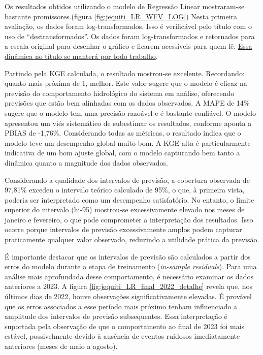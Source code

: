 Os resultados obtidos utilizando o modelo de Regressão Linear mostraram-se bastante promissores.(figura \ref{fig:jequiti_LR_WFV_LOG}) Nesta primeira avaliação, os dados foram log-transformados. Isso é verificável pelo título com o uso de ``destransformados''. Os dados foram log-transformados e retornados para a escala original para desenhar o gráfico e ficarem acessíveis para quem lê. \underline{Essa dinâmica no título se manterá por todo trabalho}.

Partindo pela KGE calculada, o resultado mostrou-se excelente. Recordando: quanto mais próxima de 1, melhor. Este valor sugere que o modelo é eficaz na previsão do comportamento hidrológico do sistema em análise, oferecendo previsões que estão bem alinhadas com os dados observados. A MAPE de 14\% sugere que o modelo tem uma precisão razoável e é bastante confiável. O modelo apresentou um viés sistemático de subestimar os resultados, conforme aponta a PBIAS de -1,76\%. Considerando todas as métricas, o resultado indica que o modelo teve um desempenho global muito bom. A KGE alta é particularmente indicativa de um bom ajuste global, com o modelo capturando bem tanto a dinâmica quanto a magnitude dos dados observados.

Considerando a qualidade dos intervalos de previsão, a cobertura observada de 97,81\% excedeu o intervalo teórico calculado de 95\%, o que, à primeira vista, poderia ser interpretado como um desempenho satisfatório. No entanto, o limite superior do intervalo (hi-95) mostrou-se excessivamente elevado nos meses de janeiro e fevereiro, o que pode comprometer a interpretação dos resultados. Isso ocorre porque intervalos de previsão excessivamente amplos podem capturar praticamente qualquer valor observado, reduzindo a utilidade prática da previsão.

É importante destacar que os intervalos de previsão são calculados a partir dos erros do modelo durante a etapa de treinamento (\textit{in-sample residuals}). Para uma análise mais aprofundada desse comportamento, é necessário examinar os dados anteriores a 2023. A figura \ref{fig:jequiti_LR_final_2022_detalhe} revela que, nos últimos dias de 2022, houve observações significativamente elevadas. É provável que os erros associados a esse período mais próximo tenham influenciado a amplitude dos intervalos de previsão subsequentes. Essa interpretação é suportada pela observação de que o comportamento ao final de 2023 foi mais estável, possivelmente devido à ausência de eventos ruidosos imediatamente anteriores (meses de maio a agosto).

